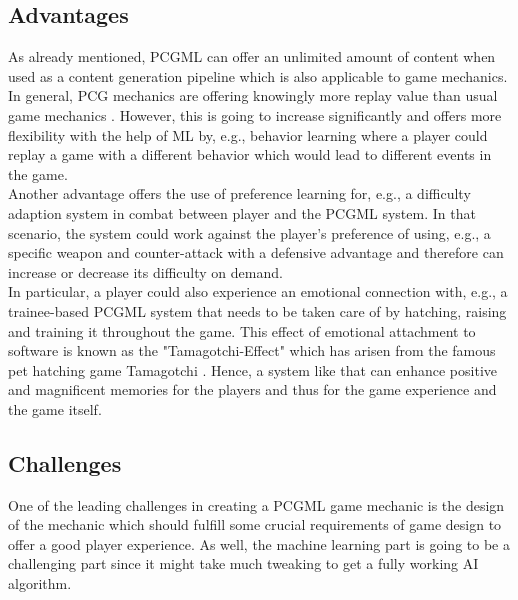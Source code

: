 \documentclass[MGS,Master,english]{twbook}%
\begin{document}
\subsection{Advantages}
As already mentioned, PCGML can offer an unlimited amount of content when used as a content generation pipeline which is also applicable to game mechanics. In general, PCG mechanics are offering knowingly more replay value than usual game mechanics \cite{pcg::book}. However, this is going to increase significantly and offers more flexibility with the help of ML by, e.g., behavior learning where a player could replay a game with a different behavior which would lead to different events in the game.\\
Another advantage offers the use of preference learning for, e.g., a difficulty adaption system in combat between player and the PCGML system. In that scenario, the system could work against the player’s preference of using, e.g., a specific weapon and counter-attack with a defensive advantage and therefore can increase or decrease its difficulty on demand.\\
In particular, a player could also experience an emotional connection with, e.g., a trainee-based PCGML system that needs to be taken care of by hatching, raising and training it throughout the game. This effect of emotional attachment to software is known as the "Tamagotchi-Effect" which has arisen from the famous pet hatching game Tamagotchi \cite{intro::tamagotchiEffect}. Hence, a system like that can enhance positive and magnificent memories for the players and thus for the game experience and the game itself.

\subsection{Challenges}
One of the leading challenges in creating a PCGML game mechanic is the design of the mechanic which should fulfill some crucial requirements of game design to offer a good player experience. As well, the machine learning part is going to be a challenging part since it might take much tweaking to get a fully working AI algorithm.
\end{document}
